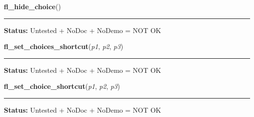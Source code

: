     \vspace{0.5ex}

\hspace{.8\funcindent}\begin{boxedminipage}{\funcwidth}

    \raggedright \textbf{fl\_hide\_choice}()

    \vspace{-1.5ex}

    \rule{\textwidth}{0.5\fboxrule}
\setlength{\parskip}{2ex}
\setlength{\parskip}{1ex}
\textbf{Status:} Untested + NoDoc + NoDemo = NOT OK



    \end{boxedminipage}

    \label{xformslib:flgoodies:fl_set_choices_shortcut}

    \vspace{0.5ex}

\hspace{.8\funcindent}\begin{boxedminipage}{\funcwidth}

    \raggedright \textbf{fl\_set\_choices\_shortcut}(\textit{p1}, \textit{p2}, \textit{p3})

    \vspace{-1.5ex}

    \rule{\textwidth}{0.5\fboxrule}
\setlength{\parskip}{2ex}
\setlength{\parskip}{1ex}
\textbf{Status:} Untested + NoDoc + NoDemo = NOT OK



    \end{boxedminipage}

    \label{xformslib:flgoodies:fl_set_choices_shortcut}

    \vspace{0.5ex}

\hspace{.8\funcindent}\begin{boxedminipage}{\funcwidth}

    \raggedright \textbf{fl\_set\_choice\_shortcut}(\textit{p1}, \textit{p2}, \textit{p3})

    \vspace{-1.5ex}

    \rule{\textwidth}{0.5\fboxrule}
\setlength{\parskip}{2ex}
\setlength{\parskip}{1ex}
\textbf{Status:} Untested + NoDoc + NoDemo = NOT OK



    \end{boxedminipage}

